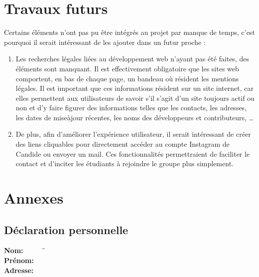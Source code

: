 \documentclass[a4,10pt,french]{sphinxmanual}
\begin{document}
\chapter{Travaux futurs}
\label{\detokenize{chapitre-05:travaux-futurs}}\label{\detokenize{chapitre-05::doc}}
\sphinxAtStartPar
Certains éléments n’ont pas pu être intégrés au projet par manque de temps, c’est pourquoi il serait intéressant de les ajouter dans un futur proche :
\begin{enumerate}
%
\item {} 
\sphinxAtStartPar
Les recherches légales liées au développement web n’ayant pas été faites, des éléments sont manquant. Il est effectivement obligatoire que les sites web comportent, en bas de chaque page, un bandeau où résident les mentions légales. Il est important que ces informations résident sur un site internet, car elles permettent aux utilisateurs de savoir s’il s’agit d’un site toujours actif ou non et d’y faire figurer des informations telles que les contacts, les adresses, les dates de mise\sphinxhyphen{}à\sphinxhyphen{}jour récentes, les noms des développeurs et contributeurs, …

\item {} 
\sphinxAtStartPar
De plus, afin d’améliorer l’expérience utilisateur, il serait intéressant de créer des liens cliquables pour directement accéder au compte Instagram de Candide ou envoyer un mail. Ces fonctionnalités permettraient de faciliter le contact et d’inciter les étudiants à rejoindre le groupe plus simplement.

\end{enumerate}

\appendix



\chapter{Annexes}
\label{\detokenize{chapitre-06:annexes}}\label{\detokenize{chapitre-06::doc}}

\section{Déclaration personnelle}
\label{\detokenize{chapitre-06:declaration-personnelle}}
{

\large
\begin{tabbing}
\textbf{Nom:} ~~~~~ \=  \= \studentlastname \\
\textbf{Prénom:}~~~ \>  \> \studentfirstname \\
\textbf{Adresse:}~~ \>  \> \studentaddress
\end{tabbing} 
}
\end{document}
